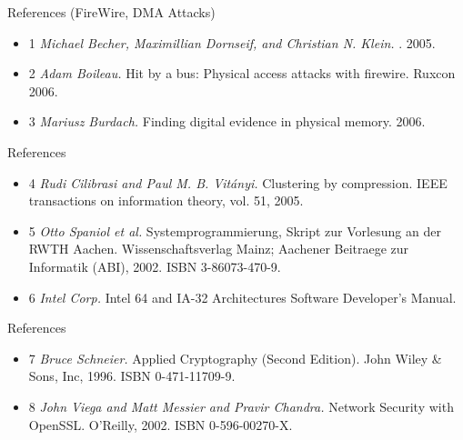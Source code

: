 \documentclass{beamer}
\newenvironment{itemizeframe}[1]
  {\begin{frame}{#1}\startitemizeframe}
  {\stopitemizeframe\end{frame}}
\newcommand\startitemizeframe{\begin{itemize}}
\newcommand\stopitemizeframe{\end{itemize}}
\begin{document}
	\begin{itemizeframe}{References (FireWire, DMA Attacks)}
		\item[1] \emph{Michael Becher, Maximillian Dornseif, and Christian N.
			Klein.} . 2005.

		\item[2] \emph{Adam Boileau.} Hit by a bus: Physical access attacks with
			firewire. Ruxcon 2006.

		\item[3] \emph{Mariusz Burdach.} Finding digital evidence in physical memory. 2006.
	\end{itemizeframe}

	\begin{itemizeframe}{References}
		\item[4] \emph{Rudi Cilibrasi and Paul M. B. Vit\'anyi.} Clustering by compression.
			IEEE transactions on information theory, vol. 51, 2005.

		\item[5] \emph{Otto Spaniol et al.} Systemprogrammierung, Skript zur Vorlesung an der RWTH
			Aachen. Wissenschaftsverlag Mainz; Aachener Beitraege zur Informatik (ABI),
			2002. ISBN 3-86073-470-9.
			
		\item[6] \emph{Intel Corp.} Intel 64 and IA-32 Architectures Software Developer’s Manual.
	\end{itemizeframe}

	\begin{itemizeframe}{References}
		\item[7] \emph{Bruce Schneier.} Applied Cryptography (Second Edition). John Wiley \& Sons,
			Inc, 1996. ISBN 0-471-11709-9.
		\item[8] \emph{John Viega and Matt Messier and Pravir Chandra.} Network Security with
			OpenSSL. O'Reilly, 2002. ISBN 0-596-00270-X.
	\end{itemizeframe}
\end{document}
